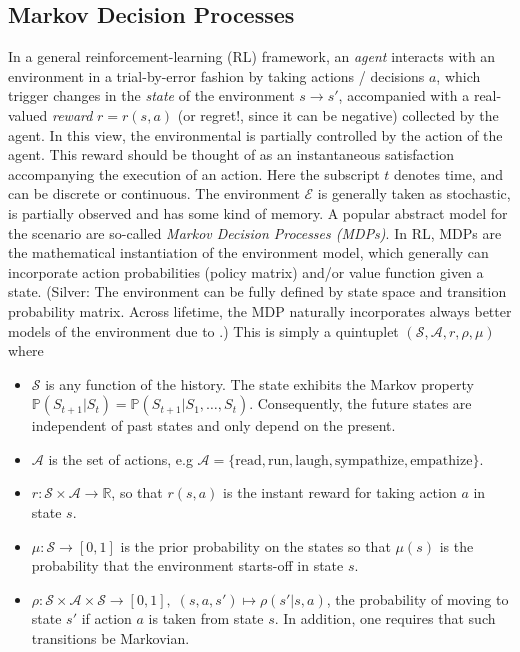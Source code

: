 \documentclass{article} %
\begin{document}
\subsection{Markov Decision Processes}
In a general reinforcement-learning (RL) framework, an \textit{agent}
interacts with an  environment in a trial-by-error fashion by taking
actions / decisions $a$, which trigger changes in the
\textit{state} of the environment
$s \rightarrow s'$, accompanied with a real-valued \textit{reward}
$r = r(s, a)$ (or regret!, since it can be negative) collected by the
agent. In this view, the environmental is partially controlled by
the action of the agent.
This reward should be thought
of as an instantaneous satisfaction accompanying the execution of
an action. Here the subscript $t$ denotes time, and can be discrete or
continuous.
The environment $\mathcal E$ is generally taken as stochastic,
is partially observed and 
has some kind of memory.
A popular abstract model for the scenario are so-called \textit{Markov Decision Processes (MDPs)}.
In RL, MDPs are the mathematical instantiation of the environment model,
which generally can incorporate action probabilities (policy matrix)
and/or value function given a state.
(Silver: The environment can be fully defined by state space and
transition probability matrix.
Across lifetime, the MDP naturally incorporates always better
models of the environment due to \points.)
This is simply a quintuplet $(\mathcal S, \mathcal A, r, \rho, \mu)$ where
\begin{itemize}
\item $\mathcal S$ is any function of the history.
The state exhibits the Markov property
$\mathbb{P}(S_{t+1}|S_{t})=\mathbb{P}(S_{t+1}|S_{1}, \dots, S_{t})$.
Consequently, the future states are independent of past states and only depend on the present.
\item $\mathcal A$ is the set of actions, e.g $\mathcal A = \{\text{read}, \text{run},
  \text{laugh}, \text{sympathize}, \text{empathize}\}.$
\item $r : \mathcal S \times \mathcal A \rightarrow \mathbb R$, so that $r(s, a)$ is the instant reward for taking action $a$ in state $s$.
\item $\mu: \mathcal S \rightarrow [0, 1]$ is the prior probability on the states so that
  $\mu(s)$ is the probability that the environment starts-off in state $s$.
  \item $\rho : \mathcal S \times \mathcal A \times \mathcal S \rightarrow [0, 1],\; (s,a,s') \mapsto \rho(s'|s,a)$, the probability of moving to state $s'$ if action $a$ is taken from state $s$. In addition, one requires that such transitions be Markovian.
\end{itemize}
\end{document}
